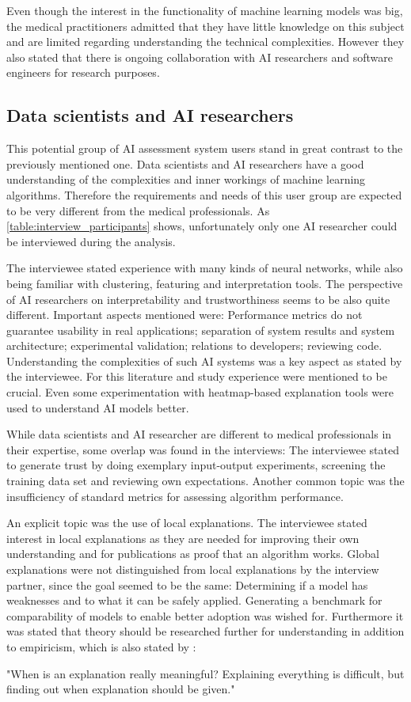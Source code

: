 \documentclass[11pt,a4paper,english]{scrreprt}
\begin{document}
Even though the interest in the functionality of machine learning models was big, the medical practitioners admitted that they have little knowledge on this subject and are limited regarding understanding the technical complexities. However they also stated that there is ongoing collaboration with AI researchers and software engineers for research purposes.

\subsection{Data scientists and AI researchers}
This potential group of AI assessment system users stand in great contrast to the previously mentioned one. Data scientists and AI researchers have a good understanding of the complexities and inner workings of machine learning algorithms. Therefore the requirements and needs of this user group are expected to be very different from the medical professionals. As \autoref{table:interview_participants} shows, unfortunately only one AI researcher could be interviewed during the analysis.

The interviewee stated experience with many kinds of neural networks, while also being familiar with clustering, featuring and interpretation tools. The perspective of AI researchers on interpretability and trustworthiness seems to be also quite different. Important aspects mentioned were: Performance metrics do not guarantee usability in real applications; separation of system results and system architecture; experimental validation; relations to developers; reviewing code. Understanding the complexities of such AI systems was a key aspect as stated by the interviewee. For this literature and study experience were mentioned to be crucial. Even some experimentation with heatmap-based explanation tools were used to understand AI models better.

While data scientists and AI researcher are different to medical professionals in their expertise, some overlap was found in the interviews: The interviewee stated to generate trust by doing exemplary input-output experiments, screening the training data set and reviewing own expectations. Another common topic was the insufficiency of standard metrics for assessing algorithm performance.

An explicit topic was the use of local explanations. The interviewee stated interest in local explanations as they are needed for improving their own understanding and for publications as proof that an algorithm works. Global explanations were not distinguished from local explanations by the interview partner, since the goal seemed to be the same: Determining if a model has weaknesses and to what it can be safely applied. Generating a benchmark for comparability of models to enable better adoption was wished for. Furthermore it was stated that theory should be researched further for understanding in addition to empiricism, which is also stated by \textcite{people_ai_google_website}:
\begin{displayquote}
    "When is an explanation really meaningful? Explaining everything is difficult, but finding out when explanation should be given."
\end{displayquote}
\end{document}
